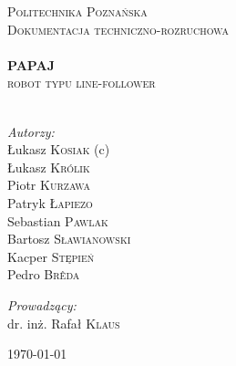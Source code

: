 \begin{titlepage}
\begin{center}


\textsc{\LARGE Politechnika Poznańska}\\[1.5cm]

\textsc{\Large Dokumentacja techniczno-rozruchowa}\\[0.5cm]

\HRule \\[0.4cm]
{ \huge \bfseries PAPAJ \\[0.4cm] }
\textsc{\Large robot typu line-follower}\\[0.5cm]

\HRule \\[1.5cm]

\noindent
\begin{minipage}[t]{0.4\textwidth}
\begin{flushleft} \large
\emph{Autorzy:}\\
Łukasz \textsc{Kosiak} (c)\\
Łukasz \textsc{Królik} \\
Piotr \textsc{Kurzawa} \\
Patryk \textsc{Łapiezo} \\
Sebastian \textsc{Pawlak} \\
Bartosz \textsc{Sławianowski} \\
Kacper \textsc{Stępień} \\
Pedro \textsc{Brêda}
\end{flushleft}
\end{minipage}%
\begin{minipage}[t]{0.4\textwidth}
\begin{flushright} \large
\emph{Prowadzący:} \\
dr. inż. Rafał \textsc{Klaus}
\end{flushright}
\end{minipage}

\vfill

{\large \today}

\end{center}
\end{titlepage}